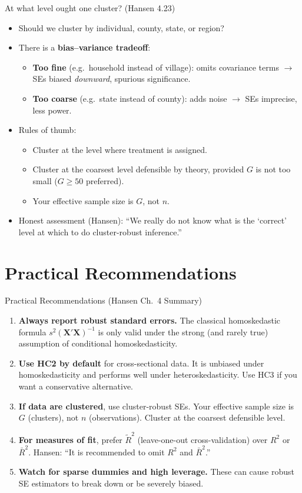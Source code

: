 \documentclass[aspectratio=169, handout, t]{beamer}
\numberwithin{equation}{section}
\begin{document}
\begin{frame}{At what level ought one cluster? (Hansen 4.23)}
\begin{itemize}
\item Should we cluster by individual, county, state, or region?
\item There is a \textbf{bias--variance tradeoff}: \pause
\begin{itemize}
\item \textbf{Too fine} (e.g.\ household instead of village): omits covariance terms $\rightarrow$ SEs biased \emph{downward}, spurious significance. \pause
\item \textbf{Too coarse} (e.g.\ state instead of county): adds noise $\rightarrow$ SEs imprecise, less power. \pause
\end{itemize}
\item Rules of thumb:
\begin{itemize}
\item Cluster at the level where treatment is assigned.
\item Cluster at the coarsest level defensible by theory, provided $G$ is not too small ($G\geq 50$ preferred).
\item Your effective sample size is $G$, not $n$.
\end{itemize}\pause
\item \alert{Honest assessment} (Hansen): ``We really do not know what is the `correct' level at which to do cluster-robust inference.''
\end{itemize}
 \end{frame}
 
 \section{Practical Recommendations}

\begin{frame}{Practical Recommendations (Hansen Ch.\ 4 Summary)}
\begin{enumerate}
\item \textbf{Always report robust standard errors.}  The classical homoskedastic formula $s^2(\bm{X'X})^{-1}$ is only valid under the strong (and rarely true) assumption of conditional homoskedasticity. \pause
\item \textbf{Use HC2 by default} for cross-sectional data.  It is unbiased under homoskedasticity and performs well under heteroskedasticity.  Use HC3 if you want a conservative alternative. \pause
\item \textbf{If data are clustered}, use cluster-robust SEs.  Your effective sample size is $G$ (clusters), not $n$ (observations).  Cluster at the coarsest defensible level. \pause
\item \textbf{For measures of fit}, prefer $\tilde{R}^2$ (leave-one-out cross-validation) over $R^2$ or $\bar{R}^2$.  Hansen:  ``It is recommended to omit $R^2$ and $\bar{R}^2$.'' \pause
\item \textbf{Watch for sparse dummies and high leverage.}  These can cause robust SE estimators to break down or be severely biased.
\end{enumerate}
\end{frame}
\end{document}
